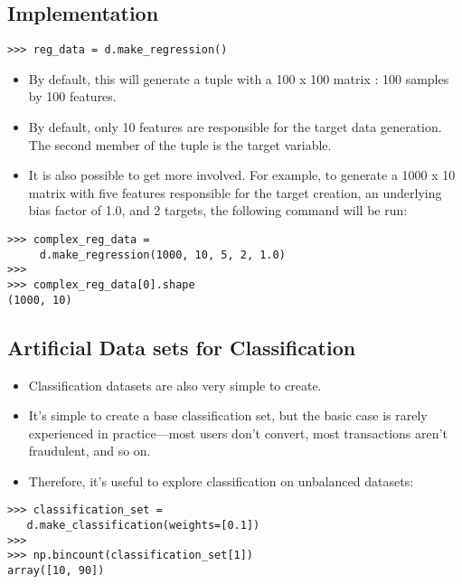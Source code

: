 \documentclass[SKL-MASTER.tex]{subfiles}
\begin{document}
\subsection*{Implementation}
%
\begin{framed}
	\begin{verbatim}
>>> reg_data = d.make_regression()
\end{verbatim}
\end{framed}
\begin{itemize}
\item By default, this will generate a tuple with a 100 x 100 matrix : 100 samples by 100 features.
\item By default, only 10 features are responsible for the target data generation. The
second member of the tuple is the target variable.
\item It is also possible to get more involved. For example, to generate a 1000 x 10 matrix with five
features responsible for the target creation, an underlying bias factor of 1.0, and 2 targets,
the following command will be run:
\end{itemize}

\begin{framed}
	\begin{verbatim}
>>> complex_reg_data =
     d.make_regression(1000, 10, 5, 2, 1.0)
>>>
>>> complex_reg_data[0].shape
(1000, 10)
\end{verbatim}
\end{framed}
\newpage
\subsection*{Artificial Data sets for Classification}
\begin{itemize}
\item Classification datasets are also very simple to create. 
\item It's simple to create a base classification
set, but the basic case is rarely experienced in practice—most users don't convert, most
transactions aren't fraudulent, and so on. \item Therefore, it's useful to explore classification on
unbalanced datasets:
\end{itemize}
\begin{framed}
\begin{verbatim}
>>> classification_set = 
   d.make_classification(weights=[0.1])
>>>
>>> np.bincount(classification_set[1])
array([10, 90])
\end{verbatim}
\end{framed}
\newpage
\end{document}
